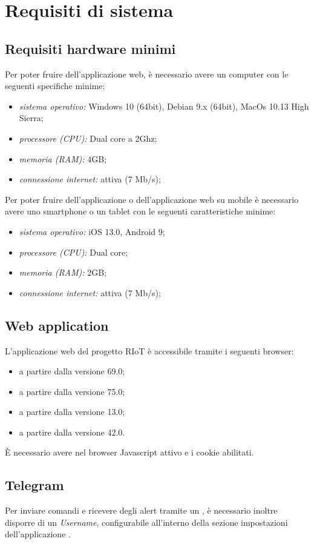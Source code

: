 \section{Requisiti di sistema}

	\subsection{Requisiti hardware minimi}
	Per poter fruire dell'applicazione web, è necessario avere un computer con le seguenti specifiche minime:
	\begin{itemize}
	 	\item \textit{sistema operativo:} Windows 10 (64bit), Debian 9.x (64bit), MacOs 10.13 High Sierra;
	 	\item \textit{processore (CPU):} Dual core a 2Ghz;
	 	\item \textit{memoria (RAM):} 4GB;
	 	\item \textit{connessione internet:} attiva (7 Mb/s); %
	\end{itemize} 
	Per poter fruire dell'applicazione  o dell'applicazione web su mobile è necessario avere uno smartphone o un tablet con le seguenti caratteristiche minime:
	\begin{itemize}
	 	\item \textit{sistema operativo:} iOS 13.0, Android 9;
	 	\item \textit{processore (CPU):} Dual core;
	 	\item \textit{memoria (RAM):} 2GB;
	 	\item \textit{connessione internet:} attiva (7 Mb/s); %
	\end{itemize} 

	\subsection{Web application}
	L'applicazione web del progetto RIoT è accessibile tramite i seguenti browser:
	\begin{itemize}
	 	\item {} a partire dalla versione 69.0;
	 	\item {} a partire dalla versione 75.0;
	 	\item {} a partire dalla versione 13.0;
	 	\item {} a partire dalla versione 42.0.
	\end{itemize} 
	È necessario avere nel browser Javascript attivo e i cookie abilitati.

	\subsection{Telegram}
	Per inviare comandi e ricevere degli alert tramite un , è necessario inoltre disporre di un \textit{Username}, configurabile all'interno della sezione impostazioni dell'applicazione .
